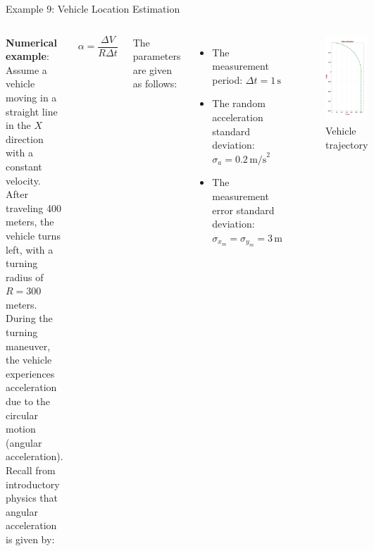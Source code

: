 \begin{frame}{Example 9: Vehicle Location Estimation}
\begin{columns}
        \textbf{Numerical example}: Assume a vehicle moving in a straight line in the $X$ direction with a constant velocity. After traveling 400 meters, the vehicle turns left, with a turning radius of $R=300$ meters. During the turning maneuver, the vehicle experiences acceleration due to the circular motion (angular acceleration). Recall from introductory physics that angular acceleration is given by:

        \[
        \alpha = \frac{\Delta V}{R \Delta t}
        \]


        The parameters are given as follows:

    \begin{itemize}
        \item The measurement period: \(\Delta t = 1 \, \text{s}\)
        \item The random acceleration standard deviation: \(\sigma_a = 0.2 \, \text{m/s}^2\)
        \item The measurement error standard deviation: \(\sigma_{x_m} = \sigma_{y_m} = 3 \, \text{m}\)
    \end{itemize}
    
                \begin{figure}
            \centering
        \includegraphics[width=0.6\linewidth]{Figures//Chapter3/VehiclePosition.png}
        \vspace{-12pt}
            \caption{Vehicle trajectory}
            \label{fig:VehicleTrajectory}
        \end{figure}
        

\end{columns}
\end{frame}
